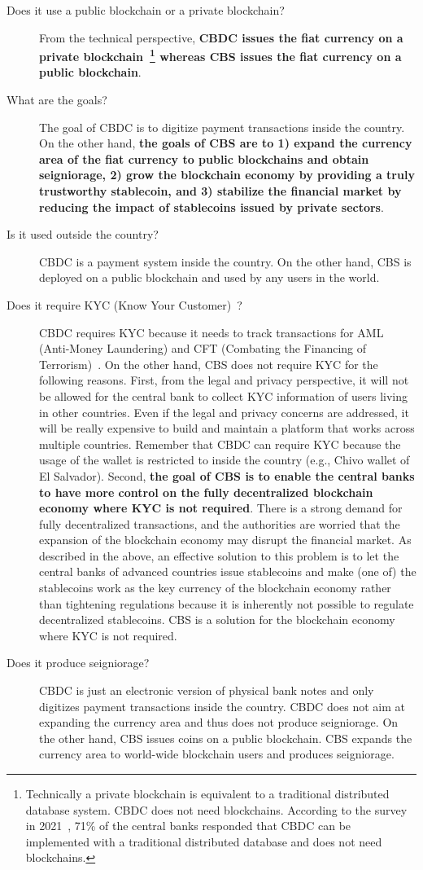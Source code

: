 \documentclass[dvipdfmx,a4paper]{article}
\begin{document}
\begin{description}
\item[Does it use a public blockchain or a private blockchain?] From the technical perspective, \textbf{CBDC issues the fiat currency on a private blockchain~\footnote{Technically a private blockchain is equivalent to a traditional distributed database system. CBDC does not need blockchains. According to the survey in 2021~\cite{ubssurvey}, 71\% of the central banks responded that CBDC can be implemented with a traditional distributed database and does not need blockchains.} whereas CBS issues the fiat currency on a public blockchain}.
\item[What are the goals?] The goal of CBDC is to digitize payment transactions inside the country. On the other hand, \textbf{the goals of CBS are to 1) expand the currency area of the fiat currency to public blockchains and obtain seigniorage, 2) grow the blockchain economy by providing a truly trustworthy stablecoin, and 3) stabilize the financial market by reducing the impact of stablecoins issued by private sectors}.
\item[Is it used outside the country?] CBDC is a payment system inside the country. On the other hand, CBS is deployed on a public blockchain and used by any users in the world.
\item[Does it require KYC (Know Your Customer)~\cite{parra2017kyc}?] CBDC requires KYC because it needs to track transactions for AML (Anti-Money Laundering) and CFT (Combating the Financing of Terrorism)~\cite{verdugo2011compliance}. On the other hand, CBS does not require KYC for the following reasons. First, from the legal and privacy perspective, it will not be allowed for the central bank to collect KYC information of users living in other countries. Even if the legal and privacy concerns are addressed, it will be really expensive to build and maintain a platform that works across multiple countries. Remember that CBDC can require KYC because the usage of the wallet is restricted to inside the country (e.g., Chivo wallet of El Salvador). Second, \textbf{the goal of CBS is to enable the central banks to have more control on the fully decentralized blockchain economy where KYC is not required}. There is a strong demand for fully decentralized transactions, and the authorities are worried that the expansion of the blockchain economy may disrupt the financial market. As described in the above, an effective solution to this problem is to let the central banks of advanced countries issue stablecoins and make (one of) the stablecoins work as the key currency of the blockchain economy rather than tightening regulations because it is inherently not possible to regulate decentralized stablecoins. CBS is a solution for the blockchain economy where KYC is not required.
\item[Does it produce seigniorage?] CBDC is just an electronic version of physical bank notes and only digitizes payment transactions inside the country. CBDC does not aim at expanding the currency area and  thus does not produce seigniorage. On the other hand, CBS issues coins on a public blockchain. CBS expands the currency area to world-wide blockchain users and produces seigniorage.
\end{description}
\end{document}
